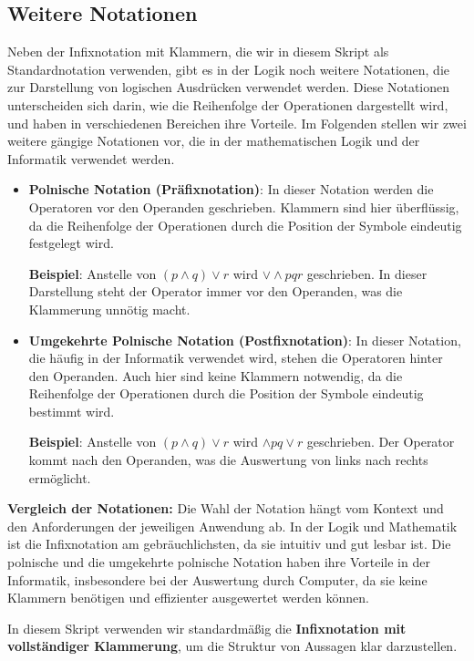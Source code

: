 \documentclass{book}
\theoremstyle{plain}
\theoremstyle{remark}
\theoremstyle{definition}
\begin{document}
\subsection{Weitere Notationen}

Neben der Infixnotation mit Klammern, die wir in diesem Skript als Standardnotation verwenden, gibt es in der Logik noch weitere Notationen, die zur Darstellung von logischen Ausdrücken verwendet werden. Diese Notationen unterscheiden sich darin, wie die Reihenfolge der Operationen dargestellt wird, und haben in verschiedenen Bereichen ihre Vorteile. Im Folgenden stellen wir zwei weitere gängige Notationen vor, die in der mathematischen Logik und der Informatik verwendet werden.

\begin{itemize}
    \item \textbf{Polnische Notation (Präfixnotation)}: In dieser Notation werden die Operatoren vor den Operanden geschrieben. Klammern sind hier überflüssig, da die Reihenfolge der Operationen durch die Position der Symbole eindeutig festgelegt wird.
    
    \textbf{Beispiel}: Anstelle von \((p \land q) \lor r\) wird \(\lor \land p q r\) geschrieben. In dieser Darstellung steht der Operator immer vor den Operanden, was die Klammerung unnötig macht.
    
    \item \textbf{Umgekehrte Polnische Notation (Postfixnotation)}: In dieser Notation, die häufig in der Informatik verwendet wird, stehen die Operatoren hinter den Operanden. Auch hier sind keine Klammern notwendig, da die Reihenfolge der Operationen durch die Position der Symbole eindeutig bestimmt wird.
    
    \textbf{Beispiel}: Anstelle von \((p \land q) \lor r\) wird \(\land p q \lor r\) geschrieben. Der Operator kommt nach den Operanden, was die Auswertung von links nach rechts ermöglicht.
\end{itemize}

\textbf{Vergleich der Notationen:} 
Die Wahl der Notation hängt vom Kontext und den Anforderungen der jeweiligen Anwendung ab. In der Logik und Mathematik ist die Infixnotation am gebräuchlichsten, da sie intuitiv und gut lesbar ist. Die polnische und die umgekehrte polnische Notation haben ihre Vorteile in der Informatik, insbesondere bei der Auswertung durch Computer, da sie keine Klammern benötigen und effizienter ausgewertet werden können.

In diesem Skript verwenden wir standardmäßig die \textbf{Infixnotation mit vollständiger Klammerung}, um die Struktur von Aussagen klar darzustellen.
\end{document}
